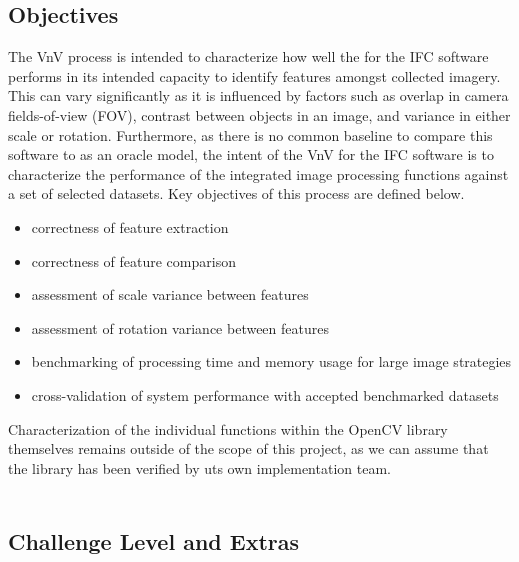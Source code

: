 \documentclass[12pt, titlepage]{article}
\begin{document}
\subsection{Objectives}
The VnV process is intended to characterize how well the for the IFC software performs in its 
intended capacity to identify features amongst collected imagery. This can vary significantly 
as it is influenced by factors such as overlap in camera fields-of-view (FOV), contrast 
between objects in an image, and variance in either scale or rotation. Furthermore, as there is 
no common baseline to compare this software to as an oracle model,  the intent of the VnV for 
the IFC software is to characterize the performance of the integrated image processing functions 
against a set of selected datasets. Key objectives of this process are defined below.
\begin{itemize}
  \item correctness of feature extraction
  \item correctness of feature comparison
  \item assessment of scale variance between features
  \item assessment of rotation variance between features
  \item benchmarking of processing time and memory usage for large image strategies
  \item cross-validation of system performance with accepted benchmarked datasets
\end{itemize}

Characterization of the individual functions within the OpenCV library themselves remains outside of the scope of 
this project, as we can assume that the library has been verified by uts own 
implementation team. 
\\ \\

\subsection{Challenge Level and Extras}

\end{document}
